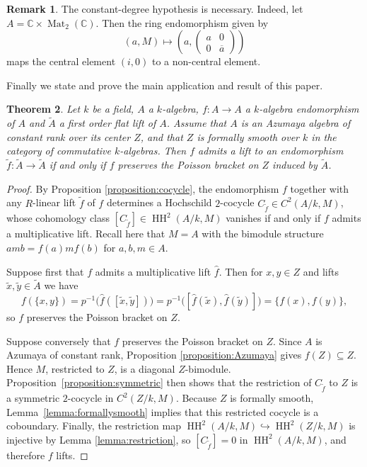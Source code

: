 \documentclass[a4paper,11pt,reqno]{amsart}%
\newtheorem{theorem}{Theorem}[section]
\theoremstyle{definition}
\newtheorem{remark}[theorem]{Remark}
\newcommand{\CC}{\mathbb{C}}
\newcommand{\HH}{\operatorname{HH}}
\newcommand{\Mat}{\operatorname{Mat}}
\newcommand{\<}{\<}
\renewcommand{\>}{\>}
\newcommand{\lA}{\widetilde{A}}
\newcommand{\lf}{\widetilde{f}}
\numberwithin{equation}{subsection}
\begin{document}
\begin{remark}
The constant-degree hypothesis is necessary. Indeed, let $A = \CC\times \Mat_2(\CC)$. Then the ring endomorphism 
given by 
$$
(a, M) \mapsto \left(a, \begin{pmatrix} a & 0 \\ 0 & \overline{a} \end{pmatrix}\right)
$$
maps the central element $(i, 0)$ to a non-central element.
\end{remark}

Finally we state and prove the main application and result of this paper.


\begin{theorem}\label{theorem:main}
Let $k$ be a field, $A$ a $k$-algebra, $f: A \rightarrow A$ a $k$-algebra endomorphism of $A$ and $\lA$ a first order flat lift of $A$. 
Assume that $A$ is an Azumaya algebra of constant rank over its center $Z$, and that $Z$ is formally smooth over $k$ in the category of commutative $k$-algebras. Then $f$ admits a lift to an endomorphism $\lf: \lA\rightarrow \lA$ if and only
if $f$ preserves the Poisson bracket on $Z$ induced by $\lA$.
\end{theorem}

\begin{proof}
By Proposition \ref{proposition:cocycle}, the endomorphism $f$ together with any $R$-linear lift 
$\lf$ of $f$ determines a Hochschild $2$-cocycle $C_{\lf} \in C^2(A/k, M)$, 
whose cohomology class $[C_{\lf}] \in \HH^2(A/k, M)$ vanishes if and only if 
$f$ admits a multiplicative lift. Recall here that $M = A$ with the 
bimodule structure $a m b = f(a) m f(b)$ for $a, b, m\in A$.

Suppose first that $f$ admits a multiplicative lift $\widehat{f}$. Then for $x,y\in Z$ and lifts $\tilde{x},\tilde{y}\in \lA$ we have
$$
f(\{x,y\}) = p^{-1}\bigl(\widehat{f}([\tilde{x},\tilde{y}])\bigr)
= p^{-1}\bigl([\widehat{f}(\tilde{x}),\widehat{f}(\tilde{y})]\bigr)
= \{f(x),f(y)\},
$$
so $f$ preserves the Poisson bracket on $Z$.

Suppose conversely that $f$ preserves the Poisson bracket on $Z$. Since $A$ is Azumaya of constant rank, Proposition \ref{proposition:Azumaya} gives $f(Z)\subseteq Z$.
Hence $M$, restricted to $Z$, is a diagonal $Z$-bimodule. Proposition~\ref{proposition:symmetric} then shows that the restriction of $C_{\lf}$ to $Z$ is a symmetric $2$-cocycle in $C^2(Z/k, M)$.
Because $Z$ is formally smooth, Lemma~\ref{lemma:formallysmooth} implies that this restricted cocycle is a coboundary.
Finally, the restriction map $\HH^2(A/k, M) \hookrightarrow \HH^2(Z/k, M)$ is injective by Lemma \ref{lemma:restriction}, so $[C_{\lf}] = 0$ in $\HH^2(A/k, M)$, and therefore $f$ lifts.
\end{proof}
\end{document}

